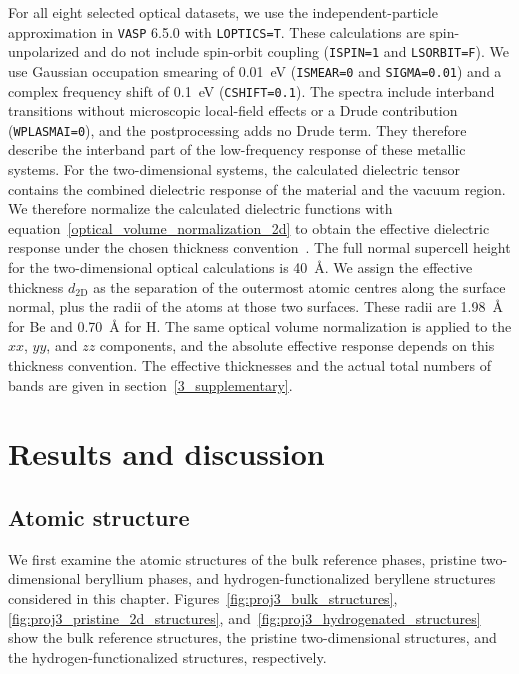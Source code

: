 For all eight selected optical datasets,
we use the independent-particle approximation in \texttt{VASP} 6.5.0 with \texttt{LOPTICS=T}.
These calculations are spin-unpolarized and do not include spin-orbit coupling
(\texttt{ISPIN=1} and \texttt{LSORBIT=F}).
We use Gaussian occupation smearing of \qty{0.01}{\electronvolt}
(\texttt{ISMEAR=0} and \texttt{SIGMA=0.01})
and a complex frequency shift of \qty{0.1}{\electronvolt} (\texttt{CSHIFT=0.1}).
The spectra include interband transitions without microscopic local-field effects or a Drude contribution
(\texttt{WPLASMAI=0}),
and the postprocessing adds no Drude term.
They therefore describe the interband part of the low-frequency response of these metallic systems.
For the two-dimensional systems,
the calculated dielectric tensor contains the combined dielectric response of the material and the vacuum region.
We therefore normalize the calculated dielectric functions with equation~\eqref{optical_volume_normalization_2d}
to obtain the effective dielectric response under the chosen thickness convention~\cite{yang2021method}.
The full normal supercell height for the two-dimensional optical calculations is \qty{40}{\angstrom}.
We assign the effective thickness $d_{\mathrm{2D}}$ as the separation of the outermost atomic centres along the surface normal,
plus the radii of the atoms at those two surfaces.
These radii are \qty{1.98}{\angstrom} for Be and \qty{0.70}{\angstrom} for H.
The same optical volume normalization is applied to the $xx$, $yy$, and $zz$ components,
and the absolute effective response depends on this thickness convention.
The effective thicknesses and the actual total numbers of bands are given in section~\ref{3_supplementary}.

\section{Results and discussion}
\label{3_results}

\subsection{Atomic structure}
\label{3_atomic_structure}

We first examine the atomic structures of the bulk reference phases,
pristine two-dimensional beryllium phases,
and hydrogen-functionalized beryllene structures considered in this chapter.
Figures~\ref{fig:proj3_bulk_structures}, \ref{fig:proj3_pristine_2d_structures}, and~\ref{fig:proj3_hydrogenated_structures} show the bulk reference structures,
the pristine two-dimensional structures,
and the hydrogen-functionalized structures,
respectively.

